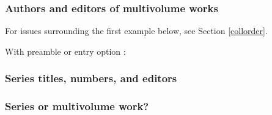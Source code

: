 \documentclass[11pt,letterpaper,oneside]{article}
\begin{document}
\subsubsection{Authors and editors of multivolume works}
\label{14.122}

For issues surrounding the first example below, see Section
\ref{collorder}.

\begin{citebib}
\item \cite{barrows1959}
\item \cite*{donne1995}
\end{citebib}

\noindent With preamble or entry option :


\begin{citebib}
\item \cite{barrows1959}
\item \cite{donne1995}
\newrefcontext[sorting=none]
\end{citebib}
\newrefcontext[sorting=nty]

\subsubsection{Series titles, numbers, and editors}
\label{14.123}

\begin{citebib}
\item \cite{lei2014}
\item \cite{mazrim2011}
\item \cite{wauchope1950}
\item \cite{allen2009}
\end{citebib}

\subsubsection{Series or multivolume work?}
\end{document}
